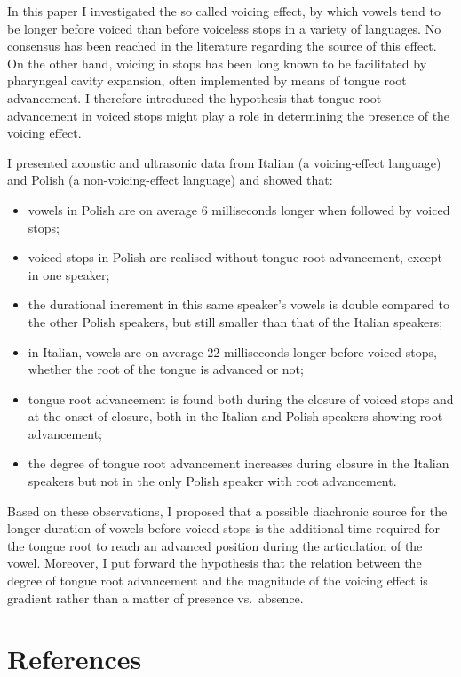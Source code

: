 \documentclass[authoryear, twocolumn]{elsarticle}
\providecommand{\tightlist}{%
  \setlength{\itemsep}{0pt}\setlength{\parskip}{0pt}}
\begin{document}
\label{s:conclusion}

In this paper I investigated the so called voicing effect, by which
vowels tend to be longer before voiced than before voiceless stops in a
variety of languages. No consensus has been reached in the literature
regarding the source of this effect. On the other hand, voicing in stops
has been long known to be facilitated by pharyngeal cavity expansion,
often implemented by means of tongue root advancement. I therefore
introduced the hypothesis that tongue root advancement in voiced stops
might play a role in determining the presence of the voicing effect.

I presented acoustic and ultrasonic data from Italian (a voicing-effect
language) and Polish (a non-voicing-effect language) and showed that:

\begin{itemize}
\tightlist
\item
  vowels in Polish are on average 6 milliseconds longer when followed by
  voiced stops;
\item
  voiced stops in Polish are realised without tongue root advancement,
  except in one speaker;
\item
  the durational increment in this same speaker's vowels is double
  compared to the other Polish speakers, but still smaller than that of
  the Italian speakers;
\item
  in Italian, vowels are on average 22 milliseconds longer before voiced
  stops, whether the root of the tongue is advanced or not;
\item
  tongue root advancement is found both during the closure of voiced
  stops and at the onset of closure, both in the Italian and Polish
  speakers showing root advancement;
\item
  the degree of tongue root advancement increases during closure in the
  Italian speakers but not in the only Polish speaker with root
  advancement.
\end{itemize}

Based on these observations, I proposed that a possible diachronic
source for the longer duration of vowels before voiced stops is the
additional time required for the tongue root to reach an advanced
position during the articulation of the vowel. Moreover, I put forward
the hypothesis that the relation between the degree of tongue root
advancement and the magnitude of the voicing effect is gradient rather
than a matter of presence vs.~absence.

\section{References}\label{references}


\end{document}
